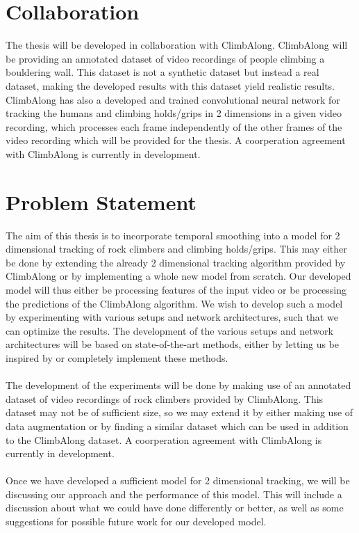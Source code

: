 \documentclass[11pt]{article}
\begin{document}
\section{Collaboration}
\label{sec:collab}
The thesis will be developed in collaboration with ClimbAlong. ClimbAlong will be providing an annotated dataset of video recordings of people climbing a bouldering wall. This dataset is not a synthetic dataset but instead a real dataset, making the developed results with this dataset yield realistic results. ClimbAlong has also a developed and trained convolutional neural network for tracking the humans and climbing holds/grips in 2 dimensions in a given video recording, which processes each frame independently of the other frames of the video recording which will be provided for the thesis. A coorperation agreement with ClimbAlong is currently in development.

\section{Problem Statement}
The aim of this thesis is to incorporate temporal smoothing into a model for 2 dimensional tracking of rock climbers and climbing holds/grips. This may either be done by extending the already 2 dimensional tracking algorithm provided by ClimbAlong or by implementing a whole new model from scratch. Our developed model will thus either be processing features of the input video or be processing the predictions of the ClimbAlong algorithm. We wish to develop such a model by experimenting with various setups and network architectures, such that we can optimize the results. The development of the various setups and network architectures will be based on state-of-the-art methods, either by letting us be inspired by or completely implement these methods.
\\
\\
The development of the experiments will be done by making use of an annotated dataset of video recordings of rock climbers provided by ClimbAlong. This dataset may not be of sufficient size, so we may extend it by either making use of data augmentation or by finding a similar dataset which can be used in addition to the ClimbAlong dataset. A coorperation agreement with ClimbAlong is currently in development. 
\\
\\
Once we have developed a sufficient model for 2 dimensional tracking, we will be discussing our approach and the performance of this model. This will include a discussion about what we could have done differently or better, as well as some suggestions for possible future work for our developed model. 
\end{document}
